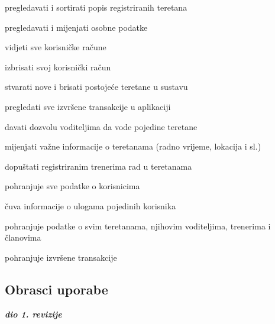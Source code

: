 \begin{packed_enum}
				\item  {}
				
				\begin{packed_enum}
					
					\item pregledavati i sortirati popis registriranih teretana
					\item pregledavati i mijenjati osobne podatke
					\item vidjeti sve korisničke račune
					\item izbrisati svoj korisnički račun
					\item stvarati nove i brisati postojeće teretane u sustavu
					\item pregledati sve izvršene transakcije u aplikaciji
					\item davati dozvolu  voditeljima da vode pojedine teretane
					\item mijenjati važne informacije o teretanama (radno vrijeme, lokacija i sl.)
					\item dopuštati registriranim trenerima rad u teretanama
					
				\end{packed_enum}


				\item  {}
				
				\begin{packed_enum}
					
					\item pohranjuje sve podatke o korisnicima
					\item čuva informacije o ulogama pojedinih korisnika
					\item pohranjuje podatke o svim teretanama, njihovim voditeljima, trenerima i članovima
					\item pohranjuje izvršene transakcije
					
				\end{packed_enum}
		
			\end{packed_enum}
			
			\eject 
			
			
				
			\subsection{Obrasci uporabe}
				
				\textbf{\textit{dio 1. revizije}}
				
